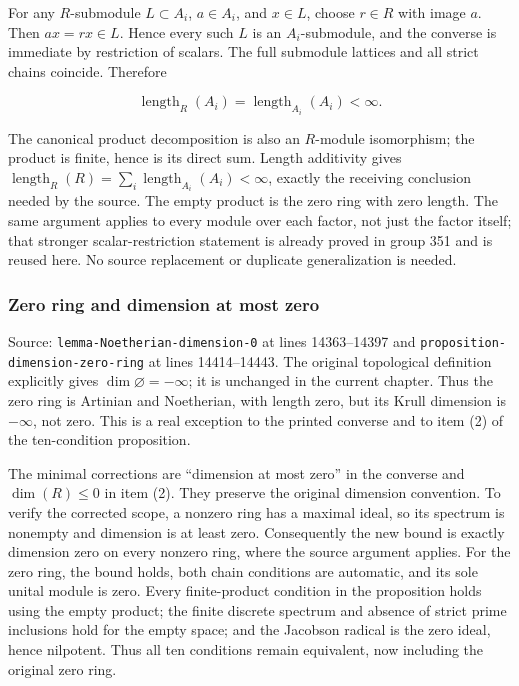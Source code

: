 For any \(R\)-submodule \(L\subset A_i\), \(a\in A_i\), and \(x\in L\), choose \(r\in R\) with image \(a\). Then \(ax=rx\in L\). Hence every such \(L\) is an \(A_i\)-submodule, and the converse is immediate by restriction of scalars. The full submodule lattices and all strict chains coincide. Therefore

\[
\operatorname{length}_R(A_i)=\operatorname{length}_{A_i}(A_i)<\infty.
\]

The canonical product decomposition is also an \(R\)-module isomorphism; the product is finite, hence is its direct sum. Length additivity gives \(\operatorname{length}_R(R)=\sum_i\operatorname{length}_{A_i}(A_i)<\infty\), exactly the receiving conclusion needed by the source. The empty product is the zero ring with zero length. The same argument applies to every module over each factor, not just the factor itself; that stronger scalar-restriction statement is already proved in group 351 and is reused here. No source replacement or duplicate generalization is needed.

\subsubsection{Zero ring and dimension at most zero}\label{algebra-proof-003-zero-ring-and-dimension-at-most-zero}

Source: \texttt{lemma-\AlgebraIdentifierBreak{}Noetherian-\AlgebraIdentifierBreak{}dimension-\AlgebraIdentifierBreak{}0} at lines 14363--14397 and \texttt{proposition-\AlgebraIdentifierBreak{}dimension-\AlgebraIdentifierBreak{}zero-\AlgebraIdentifierBreak{}ring} at lines 14414--14443. The original topological definition explicitly gives \(\dim\varnothing=-\infty\); it is unchanged in the current chapter. Thus the zero ring is Artinian and Noetherian, with length zero, but its Krull dimension is \(-\infty\), not zero. This is a real exception to the printed converse and to item (2) of the ten-condition proposition.

The minimal corrections are ``dimension at most zero'' in the converse and \(\dim(R)\leq0\) in item (2). They preserve the original dimension convention. To verify the corrected scope, a nonzero ring has a maximal ideal, so its spectrum is nonempty and dimension is at least zero. Consequently the new bound is exactly dimension zero on every nonzero ring, where the source argument applies. For the zero ring, the bound holds, both chain conditions are automatic, and its sole unital module is zero. Every finite-product condition in the proposition holds using the empty product; the finite discrete spectrum and absence of strict prime inclusions hold for the empty space; and the Jacobson radical is the zero ideal, hence nilpotent. Thus all ten conditions remain equivalent, now including the original zero ring.

